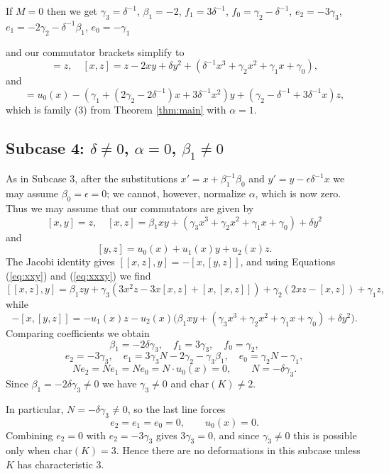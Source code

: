 \documentclass[a4paper,11pt,twoside,notitlepage,reqno]{amsart}
\theoremstyle{plain}
\numberwithin{thm}{section}
\theoremstyle{definition}
\begin{document}
If $M=0$ then we get $\gamma_3=\delta^{-1}$, $\beta_1=-2$, $f_1=3\delta^{-1}$, $f_0=\gamma_2-\delta^{-1}$, $e_2=-3\gamma_3$, $e_1=-2\gamma_2-\delta^{-1}\beta_1$, $e_0=-\gamma_1$

and our
commutator brackets simplify to 
\begin{equation}
[x,y]=z,\quad [x,z]= z -2xy + \delta y^2 + (\delta^{-1} x^3 +\gamma_2 x^2+\gamma_1 x+\gamma_0),
\end{equation}
and
\begin{equation} [y,z]= u_0(x) - (\gamma_1+(2\gamma_2 -2\delta^{-1})x + 3\delta^{-1}x^2) y +
(\gamma_2-\delta^{-1} +3\delta^{-1} x) z,
\end{equation}
which is family (3) from Theorem \ref{thm:main} with $\alpha=1$.




\subsection{Subcase 4: $\delta\neq 0$, $\alpha=0$, $\beta_1
\neq 0$}
As in Subcase 3, after the substitutions $x'=x+\beta_1^{-1}\beta_0$ and
$y'=y-\epsilon\delta^{-1}x$ we may assume $\beta_0=\epsilon=0$; we cannot, however,
normalize $\alpha$, which is now zero. Thus we may assume that our commutators are given by
$$[x,y]=z,\quad [x,z]= \beta_1 x y + (\gamma_3 x^3+ \gamma_2 x^2 + \gamma_1 x + \gamma_0 ) +\delta y^2$$
and
$$[y,z]= u_0(x) + u_1(x) y + u_2(x) z.$$
The Jacobi identity gives $[[x,z],y]=-[x,[y,z]]$, and using Equations
(\ref{eq:xxy}) and (\ref{eq:xxxy}) we find
$$[[x,z],y] = \beta_1 zy + \gamma_3 (3x^2 z-3x[x,z]+[x,[x,z]]) + \gamma_2 (2xz -[x,z]) + \gamma_1 z,$$
while
$$-[x,[y,z]]= -u_1(x) z - u_2(x) \big(\beta_1 xy +(\gamma_3 x^3+ \gamma_2 x^2 + \gamma_1 x + \gamma_0 ) +\delta y^2\big).$$
Comparing coefficients we obtain
$$\beta_1 =- 2\delta\gamma_3, \quad f_1 = 3\gamma_3, \quad  f_0 = \gamma_2,$$
$$e_2 = -3\gamma_3, \quad e_1 = 3\gamma_3 N - 2\gamma_2 - \gamma_3\beta_1, \quad e_0 = \gamma_2 N - \gamma_1,$$
$$N e_2  = N e_1 = N e_0 = N\cdot u_0(x) = 0, \qquad N=-\delta\gamma_3.$$
Since $\beta_1=-2\delta\gamma_3
\neq 0$ we have $\gamma_3
\neq 0$ and $\mathrm{char}(K)
\neq 2$.

In particular, $N=-\delta\gamma_3
\neq 0$, so the last line forces
$$e_2=e_1=e_0=0,\qquad u_0(x)=0.$$
Combining $e_2=0$ with $e_2=-3\gamma_3$ gives $3\gamma_3=0$, and since $\gamma_3
\neq 0$
this is possible only when $\mathrm{char}(K)=3$. Hence there are no deformations in this
subcase unless $K$ has characteristic $3$.
\end{document}
